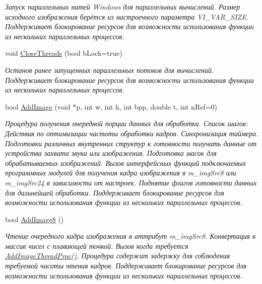 \begin{DoxyCompactItemize}
\begin{DoxyCompactList}\small\item\em Запуск параллельных нитей Windows для параллельных вычислений. Размер исходного изображения берётся из настроечного параметра V\+I\+\_\+\+V\+A\+R\+\_\+\+S\+I\+Z\+E. Поддерживает блокирование ресурсов для возможности использования функции из нескольких параллельных процессов. \end{DoxyCompactList}\item 
void \hyperlink{class_c_v_i_engine_base_a0905eba46bb64f25a2d91f8b39a3f994}{Close\+Threads} (bool b\+Lock=true)
\begin{DoxyCompactList}\small\item\em Останов ранее запущенных параллельных потоков для вычислений. Поддерживает блокирование ресурсов для возможности использования функции из нескольких параллельных процессов. \end{DoxyCompactList}\item 
bool \hyperlink{class_c_v_i_engine_base_ac886baeaf14b16970d089edaf6767a79}{Add\+Image} (void $\ast$p, int w, int h, int bpp, double t, int n\+Ref=0)
\begin{DoxyCompactList}\small\item\em Процедура получения очередной порции данных для обработки. Список шагов\+: Действия по оптимизации частоты обработки кадров. Синхронизация таймера. Подготовки различных внутренних структур к готовности получать данные от устройства захвата звука или изображения. Подготовка масок для обрабатываемых изображений. Вызов интерфейсных функций подключаемых программных модулей для получения кадра изображения в m\+\_\+img\+Src8 или m\+\_\+img\+Src24 в зависимости от настроек. Поднятие флагов готовности данных для дальнейшей обработки. Поддерживает блокирование ресурсов для возможности использования функции из нескольких параллельных процессов. \end{DoxyCompactList}\item 
bool \hyperlink{class_c_v_i_engine_base_a3fe6ae4f9ac6b9422c22d99878f424f5}{Add\+Image8} ()
\begin{DoxyCompactList}\small\item\em Чтение очередного кадра изображения в аттрибут m\+\_\+img\+Src8. Конвертация в массив чисел с плавающей точкой. Вызов когда требуется \hyperlink{class_c_v_i_engine_base_ac9fbe14762f4d2bf7d0bffe451a329ee}{Add\+Image\+Thread\+Proc()}. Процедура содержит задержку для соблюдения требуемой часоты чтения кадров. Поддерживает блокирование ресурсов для возможности использования функции из нескольких параллельных процессов. \end{DoxyCompactList}\item 

\end{DoxyCompactItemize}
